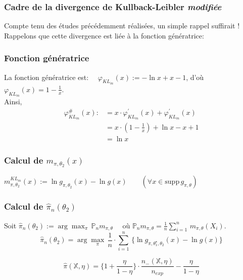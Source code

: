 \documentclass{article}
\begin{document}
            \subsubsection{Cadre de la divergence de Kullback-Leibler \textit{modifiée}}

                {\color{red} Compte tenu des études précédemment réalisées, un simple rappel suffirait !}\\
    
                Rappelons que cette divergence est liée à la fonction génératrice:
            \subsubsection*{Fonction génératrice}
                La fonction génératrice est: $\quad \varphi_{KL_m}(x):=-\ln{}x+x-1$, d'où $\varphi_{KL_m}(x) = 1 - \frac{1}{x}$. \\
                Ainsi,
                \begin{align*}
                    \varphi^\#_{KL_m}(x)   :& = x\cdot\varphi_{KL_m}^\prime(x) + \varphi^\prime_{KL_m}(x) \\
                                            & = x\cdot(1-\frac{1}{x}) + \ln{}x - x + 1 \\
                                            & = \ln{}x
                \end{align*}
            \subsubsection*{Calcul de $m_{\pi,\theta_2}(x)$}
                $m^{KL_m}_{\pi,\theta_2}(x) := \ln{}g_{\pi,\theta_2}(x) - \ln{}g(x) \qquad (\forall{}x\in\mathrm{supp}\, g_{\pi,\theta})$ 
            \subsubsection*{Calcul de $\hat\pi_n(\theta_2)$}
                Soit $\hat\pi_n(\theta_2) := \arg\max_{\pi}\, \mathbb{P}_n{}m_{\pi,\theta}\quad$ où $\mathbb{P}_n{}m_{\pi,\theta} = \frac{1}{n}\sum_{i=1}^n\, m_{\pi,\theta}(X_i)$. \\

                $$ \hat\pi_n(\theta_2) = \arg\max_{\pi}\, \frac{1}{n}\cdot\sum_{i=1}^n\, \{ \ln{}g_{\pi,\theta_1^\star,\theta_2}(x) - \ln{}g(x) \} $$

                $$ \hat\pi(\mathbb{X},\eta) = \{1+\dfrac{\eta}{1-\eta}\}\cdot\dfrac{n_-(\mathbb{X},\eta)}{n_{exp}} - \dfrac{\eta}{1-\eta} $$
\end{document}
